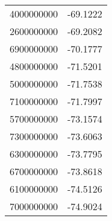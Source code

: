 \begin{tabular}{ll}
4000000000 & -69.1222 \\ 
2600000000 & -69.2082 \\ 
6900000000 & -70.1777 \\ 
4800000000 & -71.5201 \\ 
5000000000 & -71.7538 \\ 
7100000000 & -71.7997 \\ 
5700000000 & -73.1574 \\ 
7300000000 & -73.6063 \\ 
6300000000 & -73.7795 \\ 
6700000000 & -73.8618 \\ 
6100000000 & -74.5126 \\ 
7000000000 & -74.9024 \\ 
\hline 
\end{tabular}